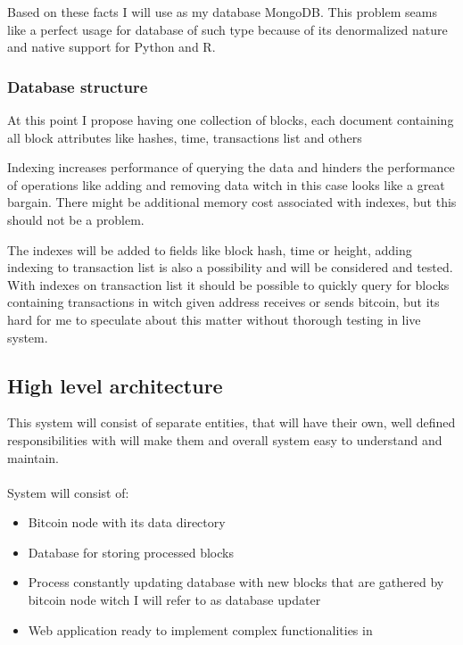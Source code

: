 \documentclass[12pt, en, eng]{mgr}
\begin{document}
Based on these facts I will use as my database MongoDB. This problem seams like a perfect usage for database of such type because of its denormalized nature and native support for Python and R.


\subsubsection{Database structure}
 
 At this point I propose having one collection of blocks, each document containing all block attributes like hashes, time, transactions list and others
 
Indexing increases performance of querying the data and hinders the performance of operations like adding and removing data witch in this case looks like a great bargain. There might be additional memory cost associated with indexes, but this should not be a problem.

The indexes will be added to fields like block hash, time or height, adding indexing to transaction list is also a possibility and will be considered and tested. With indexes on transaction list it should be possible to quickly query for blocks containing transactions in witch given address receives or sends bitcoin, but its hard for me to speculate about this matter without thorough testing in live system.

\subsection{High level architecture}
This system will consist of separate entities, that will have their own, well defined responsibilities with will make them and overall system easy to understand and maintain.
\\
\\
System will consist of:
\begin{itemize}
\item
Bitcoin node with its data directory
\item
Database for storing processed blocks
\item
Process constantly updating database with new blocks that are gathered by bitcoin node witch I will refer to as database updater
\item
Web application ready to implement complex functionalities in
\end{itemize}
\end{document}
